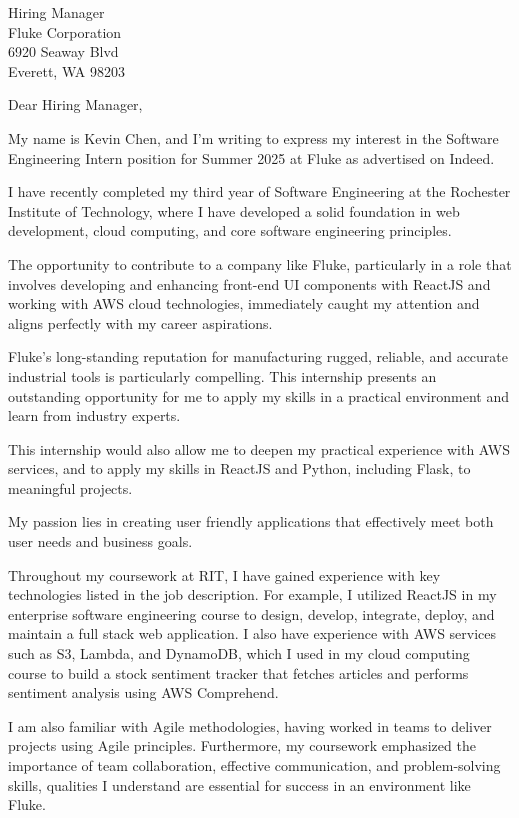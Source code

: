 \documentclass[letterpaper,11pt]{letter} %
\begin{document}
\begin{letter}{
    Hiring Manager \\ %
    Fluke Corporation \\
    6920 Seaway Blvd \\
    Everett, WA 98203
}

\opening{Dear Hiring Manager,}

My name is Kevin Chen, and I'm writing to express my interest in the Software Engineering Intern position for Summer 2025 at Fluke as advertised on Indeed.

I have recently completed my third year of Software Engineering at the Rochester Institute of Technology, where I have developed a solid foundation in web development, cloud computing, and core software engineering principles.

The opportunity to contribute to a company like Fluke, particularly in a role that involves developing and enhancing front-end UI components with ReactJS and working with AWS cloud technologies, immediately caught my attention and aligns perfectly with my career aspirations.

Fluke's long-standing reputation for manufacturing rugged, reliable, and accurate industrial tools is particularly compelling. This internship presents an outstanding opportunity for me to apply my skills in a practical environment and learn from industry experts.

This internship would also allow me to deepen my practical experience with AWS services, and to apply my skills in ReactJS and Python, including Flask, to meaningful projects.

My passion lies in creating user friendly applications that effectively meet both user needs and business goals.

Throughout my coursework at RIT, I have gained experience with key technologies listed in the job description. For example, I utilized ReactJS in my enterprise software engineering course to design, develop, integrate, deploy, and maintain a full stack web application. I also have experience with AWS services such as S3, Lambda, and DynamoDB, which I used in my cloud computing course to build a stock sentiment tracker that fetches articles and performs sentiment analysis using AWS Comprehend.

I am also familiar with Agile methodologies, having worked in teams to deliver projects using Agile principles. Furthermore, my coursework emphasized the importance of team collaboration, effective communication, and problem-solving skills, qualities I understand are essential for success in an environment like Fluke.


\end{letter}
\end{document}
